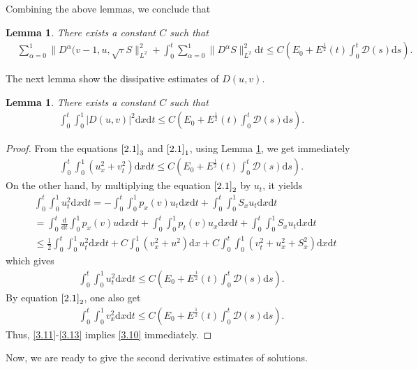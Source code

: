 \documentclass[10pt,reqno]{amsart}
\numberwithin{equation}{section}
\newtheorem{lemma}[theorem]{Lemma}
\newcommand{\dif}{\mathrm{d}}
\newcommand{\SUM}[3]{\sum\limits_{{#1}={#2}}^{#3}}
\begin{document}
Combining the above lemmas, we conclude that 
\begin{lemma}\label{Le3.5}
There exists a constant $C$ such that
\begin{align}\label{3.9}
&\SUM \alpha 0 1  \| D^\alpha(v-1, u, \sqrt{\tau} S\|_{L^2}^2 +\int_0^t \SUM \alpha 0 1 \|D^\alpha  S\|_{L^2}^2 \dif t \le C(E_0+E^\frac{1}{2}(t) \int_0^t \mathcal D (s)\dif s).
\end{align}
\end{lemma}
The next lemma show the dissipative estimates of $D(u, v)$.
\begin{lemma}\label{Le3.6}
There exists a constant $C$ such that
\begin{align}\label{3.10}
\int_0^t \int_0^1|D(u,v)|^2 \dif x \dif t \le C(E_0+E^\frac{1}{2}(t) \int_0^t \mathcal D (s)\dif s).
\end{align}
\end{lemma}
\begin{proof}
From the equations $\eqref{2.1}_3$ and $\eqref{2.1}_1$,  using Lemma \ref{Le3.5}, we get immediately 
\begin{align}\label{3.11}
\int_0^t \int_0^1 (u_x^2+v_t^2)\dif x \dif t \le C(E_0+E^\frac{1}{2}(t) \int_0^t \mathcal D (s)\dif s).
\end{align}
On the other hand, by multiplying the equation  $\eqref{2.1}_2$ by $u_t$, it yields
\begin{align*}
&\int_0^t \int_0^1 u_t^2 \dif x \dif t =-\int_0^t\int_0^1 p_x(v) u_t \dif x\dif t +\int_0^t\int_0^1 S_x u_t \dif x \dif t\\
&=\int_0^t \frac{\dif}{\dif t} \int_0^1 p_x(v) u\dif x \dif t +\int_0^t \int_0^1p_{t}(v) u_x\dif x\dif t+\int_0^t\int_0^1 S_x u_t \dif x \dif t\\
&\le \frac{1}{2} \int_0^t \int_0^1 u_t^2 \dif x \dif t + C\int_0^1 (v_x^2+u^2)\dif x +C\int_0^t\int_0^1( v_t^2+u_x^2+S_x^2)\dif x \dif t
\end{align*}
which gives
\begin{align}\label{3.12}
\int_0^t \int_0^1 u_t^2 \dif x \dif t \le C(E_0+E^\frac{1}{2}(t) \int_0^t \mathcal D (s)\dif s).
\end{align}
By equation $\eqref{2.1}_2$, one also get
\begin{align}\label{3.13}
\int_0^t \int_0^1 v_x^2 \dif x \dif t \le C(E_0+E^\frac{1}{2}(t) \int_0^t \mathcal D (s)\dif s).
\end{align}
Thus, \eqref{3.11}-\eqref{3.13} implies \eqref{3.10} immediately. 
\end{proof}
Now, we are ready to give the second derivative estimates of solutions. 
\end{document}
